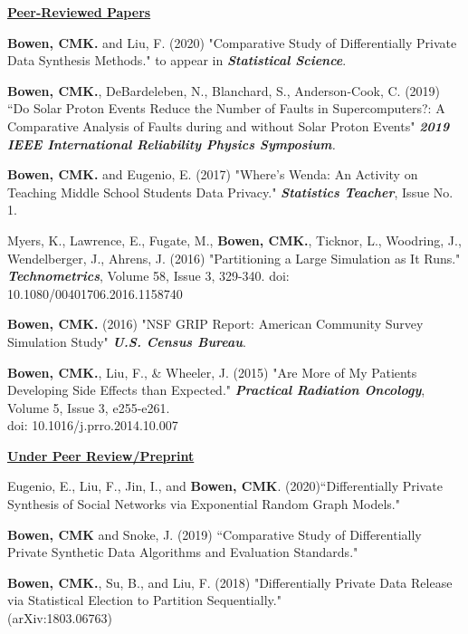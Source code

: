 \documentclass[11pt, letterpaper, roman]{moderncv} %
\begin{document}
\noindent\underline{\textbf{Peer-Reviewed Papers}}
\vspace{6pt}
\begin{etaremune}[topsep=0pt, itemsep=12pt, partopsep=0pt, parsep=0pt]
    \item \textbf{Bowen, CMK.} and Liu, F. (2020) "Comparative Study of Differentially Private Data Synthesis Methods." to appear in \textbf{\textit{Statistical Science}}.

    \item \textbf{Bowen, CMK.}, DeBardeleben, N., Blanchard, S., Anderson-Cook, C. (2019) ``Do Solar Proton Events Reduce the Number of Faults in Supercomputers?: A Comparative Analysis of Faults during and without Solar Proton Events" \textit{\textbf{2019 IEEE International Reliability Physics Symposium}.}

    \item \textbf{Bowen, CMK.} and Eugenio, E. (2017) "Where's Wenda:  An Activity on Teaching Middle School Students Data Privacy." \textit{\textbf{Statistics Teacher}}, Issue No. 1.
    
    \item Myers, K., Lawrence, E., Fugate, M., \textbf{Bowen, CMK.}, Ticknor, L., Woodring, J., Wendelberger, J., Ahrens, J. (2016) "Partitioning a Large Simulation as It Runs." \textit{\textbf{Technometrics}}, Volume 58, Issue 3, 329-340. 
    doi: 10.1080/00401706.2016.1158740

    \item \textbf{Bowen, CMK.} (2016) "NSF GRIP Report: American Community Survey Simulation Study" \textbf{\textit{U.S. Census Bureau}}.   

    \item \textbf{Bowen, CMK.}, Liu, F., \& Wheeler, J. (2015) "Are More of My Patients Developing Side Effects than Expected." \textit{\textbf{Practical Radiation Oncology}}, Volume 5, Issue 3, e255-e261.\\
    doi: 10.1016/j.prro.2014.10.007
    
\vspace{6pt}
\hspace{-0.30in}\noindent\underline{\textbf{Under Peer Review/Preprint}}
    \item Eugenio, E., Liu, F., Jin, I., and \textbf{Bowen, CMK}. (2020)``Differentially Private Synthesis of Social Networks via Exponential Random Graph Models."
    
    \item \textbf{Bowen, CMK} and Snoke, J. (2019) ``Comparative Study of Differentially Private Synthetic Data Algorithms and Evaluation Standards."

    \item \textbf{Bowen, CMK.}, Su, B., and Liu, F. (2018) "Differentially Private Data Release via Statistical Election to Partition Sequentially."\\
    (arXiv:1803.06763)
\end{etaremune}
\end{document}
